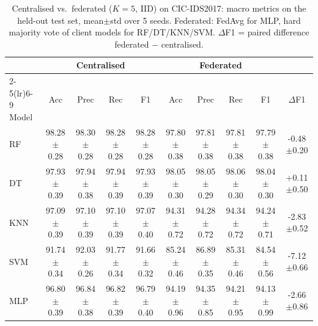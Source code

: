 \begin{table}[t]
\centering\footnotesize
\caption{Centralised vs.\ federated ($K=5$, IID) on CIC-IDS2017: macro metrics on the held-out test set, mean$\pm$std over 5 seeds. Federated: FedAvg for MLP, hard majority vote of client models for RF/DT/KNN/SVM. $\Delta$F1 = paired difference federated $-$ centralised.}
\label{tab:cent_vs_fed_cicids}
\begin{tabular}{l cccc cccc c}
\toprule
 & \multicolumn{4}{c}{Centralised} & \multicolumn{4}{c}{Federated} & \\
\cmidrule(lr){2-5}\cmidrule(lr){6-9}
Model & Acc & Prec & Rec & F1 & Acc & Prec & Rec & F1 & $\Delta$F1 \\
\midrule
RF & 98.28$\pm$0.28 & 98.30$\pm$0.28 & 98.28$\pm$0.28 & 98.28$\pm$0.28 & 97.80$\pm$0.38 & 97.81$\pm$0.38 & 97.81$\pm$0.38 & 97.79$\pm$0.38 & -0.48$\pm$0.20 \\
DT & 97.93$\pm$0.39 & 97.94$\pm$0.38 & 97.94$\pm$0.39 & 97.93$\pm$0.39 & 98.05$\pm$0.30 & 98.05$\pm$0.29 & 98.06$\pm$0.30 & 98.04$\pm$0.30 & +0.11$\pm$0.50 \\
KNN & 97.09$\pm$0.39 & 97.10$\pm$0.39 & 97.10$\pm$0.39 & 97.07$\pm$0.40 & 94.31$\pm$0.72 & 94.28$\pm$0.72 & 94.34$\pm$0.72 & 94.24$\pm$0.71 & -2.83$\pm$0.52 \\
SVM & 91.74$\pm$0.34 & 92.03$\pm$0.26 & 91.77$\pm$0.34 & 91.66$\pm$0.32 & 85.24$\pm$0.46 & 86.89$\pm$0.35 & 85.31$\pm$0.46 & 84.54$\pm$0.56 & -7.12$\pm$0.66 \\
MLP & 96.80$\pm$0.39 & 96.84$\pm$0.38 & 96.82$\pm$0.39 & 96.79$\pm$0.40 & 94.19$\pm$0.96 & 94.35$\pm$0.85 & 94.21$\pm$0.95 & 94.13$\pm$0.99 & -2.66$\pm$0.86 \\
\bottomrule
\end{tabular}
\end{table}
